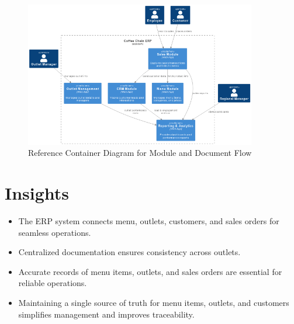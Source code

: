 \begin{figure}[H]
\centering
\includegraphics[width=0.9\textwidth,keepaspectratio]{diagrams/C2.png}
\caption{Reference Container Diagram for Module and Document Flow}
\end{figure}

\section*{Insights}
\begin{itemize}
    \item The ERP system connects menu, outlets, customers, and sales orders for seamless operations.  
    \item Centralized documentation ensures consistency across outlets.  
    \item Accurate records of menu items, outlets, and sales orders are essential for reliable operations.  
    \item Maintaining a single source of truth for menu items, outlets, and customers simplifies management and improves traceability.
\end{itemize}
